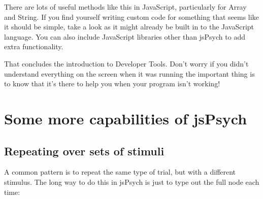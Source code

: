 \documentclass[letterpaper,10pt,english]{sphinxmanual}
\begin{document}
There are lots of useful methods like this in JavaScript,
particularly for Array and String.
If you find yourself writing custom code for something that seems like it
should be simple, take
a look as it might already be built in to the JavaScript language. You can also
include JavaScript libraries other than jsPsych to add extra functionality.

That concludes the introduction to Developer Tools. Don’t worry if you didn’t understand
everything on the screen when it was running \textendash{} the important thing is to know that it’s
there to help you when your program isn’t working!


\section{Some more capabilities of jsPsych}
\label{\detokenize{jspsych_au:some-more-capabilities-of-jspsych}}

\subsection{Repeating over sets of stimuli}
\label{\detokenize{jspsych_au:repeating-over-sets-of-stimuli}}
A common pattern is to repeat the same type of trial, but with a different
stimulus. The long way to do this in jsPsych is just to type out the full
node each time:

\begin{sphinxVerbatim}[commandchars=\\\{\}]
   
     
     

   
     
     

   
     
     

     \PYG{p}{[}  \PYG{p}{]}
\end{sphinxVerbatim}
\end{document}
